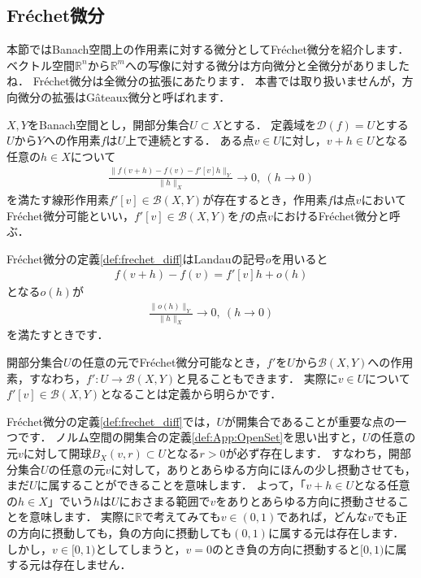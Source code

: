 \subsection{Fr\'echet微分}\label{sec:define_Frechet_diff}
本節ではBanach空間上の作用素に対する微分としてFr\'echet微分を紹介します．
ベクトル空間${\mathbb R}^n$から${\mathbb R}^m$への写像に対する微分は方向微分と全微分がありましたね．
Fr\'echet微分は全微分の拡張にあたります．
本書では取り扱いませんが，方向微分の拡張はG\^ateaux微分と呼ばれます．


\begin{defi}[Fr\'echet微分]\label{def:frechet_diff}
$X, Y$をBanach空間とし，開部分集合$U \subset X$とする．
定義域を${\mathcal D}(f) = U$とする$U$から$Y$への作用素$f$は$U$上で連続とする．
ある点$v \in U$に対し，$v + h \in U$となる任意の$h \in X$について
\begin{align*}
\frac{ \| f(v + h) - f(v) - f'[v] h \|_{Y} }{\| h \|_{X}} \rightarrow 0, ~ (h \rightarrow 0)
\end{align*}
を満たす線形作用素$f'[v] \in {\mathcal B}(X, Y)$が存在するとき，作用素$f$は点$v$においてFr\'echet微分可能といい，$f'[v] \in {\mathcal B}(X, Y)$を$f$の点$v$におけるFr\'echet微分と呼ぶ．
\end{defi}

Fr\'echet微分の定義\ref{def:frechet_diff}はLandauの記号$o$を用いると
\begin{align*}
  f(v + h) - f(v) =  f'[v] h + o( h )
\end{align*}
となる$o(h)$が
\begin{align*}
  \frac{\| o( h ) \|_{Y}  }{ \| h \|_{X} } \rightarrow 0, ~ (h \rightarrow 0)
\end{align*}
を満たすときです．

開部分集合$U$の任意の元でFr\'echet微分可能なとき，$f'$を$U$から${\mathcal B}(X, Y)$への作用素，すなわち，$f': U \rightarrow {\mathcal B}(X, Y)$と見ることもできます．
実際に$v \in U$について$f'[v] \in {\mathcal B}(X, Y)$となることは定義から明らかです．

Fr\'echet微分の定義\ref{def:frechet_diff}では，$U$が開集合であることが重要な点の一つです．
ノルム空間の開集合の定義\ref{def:App:OpenSet}を思い出すと，$U$の任意の元$v$に対して開球$B_X(v, r) \subset U$となる$r>0$が必ず存在します．
すなわち，開部分集合$U$の任意の元$v$に対して，ありとあらゆる方向にほんの少し摂動させても，まだ$U$に属することができることを意味します．
よって，「$v + h \in U$となる任意の$h \in X$」でいう$h$は$U$におさまる範囲で$v$をありとあらゆる方向に摂動させることを意味します．
実際に${\mathbb R}$で考えてみても$v \in (0,1)$であれば，どんな$v$でも正の方向に摂動しても，負の方向に摂動しても$(0,1)$に属する元は存在します．
しかし，$v \in [0,1)$としてしまうと，$v = 0$のとき負の方向に摂動すると$[0,1)$に属する元は存在しません．


